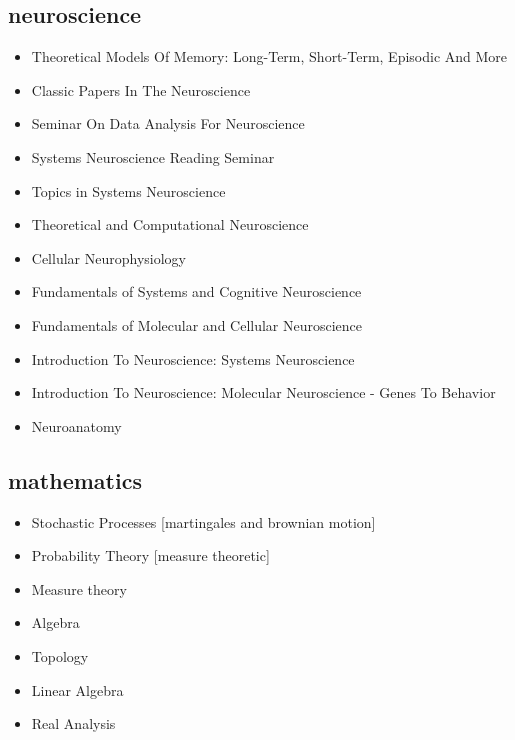 \documentclass[11pt,print]{friggeri-cv}%
\begin{document}
\begin{multicols}{2}[]

\begin{minipage}{1.1\columnwidth}

\subsection{neuroscience}
\begin{itemize}
\item Theoretical Models Of Memory: Long-Term, Short-Term, Episodic And More
\item Classic Papers In The Neuroscience
\item Seminar On Data Analysis For Neuroscience
\item Systems Neuroscience Reading Seminar
\item Topics in Systems Neuroscience
\item Theoretical and Computational Neuroscience
\item Cellular Neurophysiology
\item Fundamentals of Systems and Cognitive Neuroscience
\item Fundamentals of Molecular and Cellular Neuroscience
\item Introduction To Neuroscience: Systems Neuroscience
\item Introduction To Neuroscience: Molecular Neuroscience - Genes To Behavior
\item Neuroanatomy	
\end{itemize}


\end{minipage}

\hspace{-1em}
\begin{minipage}{1.05\columnwidth}

\subsection{mathematics}
\begin{itemize}
\item Stochastic Processes {\small[martingales and brownian motion]}
\item Probability Theory {\small[measure theoretic]}
\item Measure theory
\item Algebra
\item Topology
\item Linear Algebra
\item Real Analysis
\end{itemize}


\end{minipage}
\end{multicols}
\end{document}
